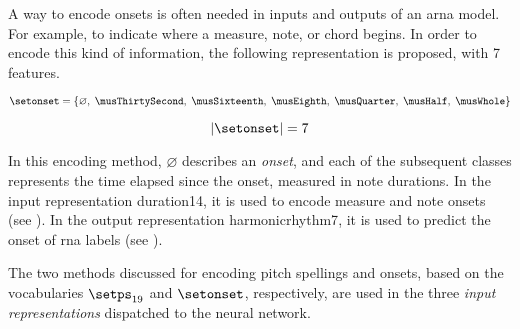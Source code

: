 
A way to encode onsets is often needed in inputs and outputs
of an \gls{arna} model. For example, to indicate where a
measure, note, or chord begins. 
In order to encode this kind of information, the following
representation is proposed, with 7 features.

\begin{equation}
    \label{eq:onset_7}
    \setonset = \{\varnothing,\; \musThirtySecond,\; \musSixteenth,\; 
    \musEighth,\; \musQuarter,\; \musHalf,\; \musWhole \}
\end{equation}

\begin{equation}
    \label{eq:onset_7_magnitude}
    | \setonset | = 7
\end{equation}

In this encoding method, $\varnothing$ describes an
\emph{onset}, and each of the subsequent classes represents
the time elapsed since the onset, measured in note
durations. In the input representation \gls{duration14}, it
is used to encode measure and note onsets (see
). In the output
representation \gls{harmonicrhythm7}, it is used to predict
the onset of \gls{rna} labels (see
).

The two methods discussed for encoding pitch spellings and
onsets, based on the vocabularies $\setps_{19}$ and
$\setonset$, respectively, are used in the three \emph{input
representations} dispatched to the neural network.
